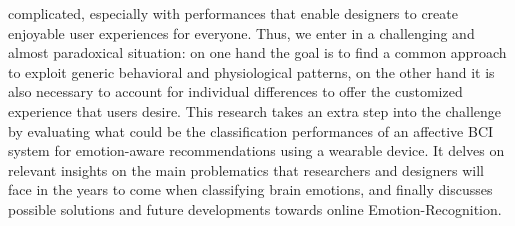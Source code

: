 complicated, especially with performances that enable designers to create enjoyable user experiences for everyone. Thus, we enter in a challenging and almost paradoxical situation: on one hand the goal is to find a common approach to exploit generic behavioral and physiological patterns, on the other hand it is also necessary to account for individual differences to offer the customized experience that users desire. This research takes an extra step into the challenge by evaluating what could be the classification performances of an affective \ac{BCI} system for emotion-aware recommendations using a wearable device. It delves on relevant insights on the main problematics that researchers and designers will face in the years to come when classifying brain emotions, and finally discusses possible solutions and future developments towards online Emotion-Recognition.

